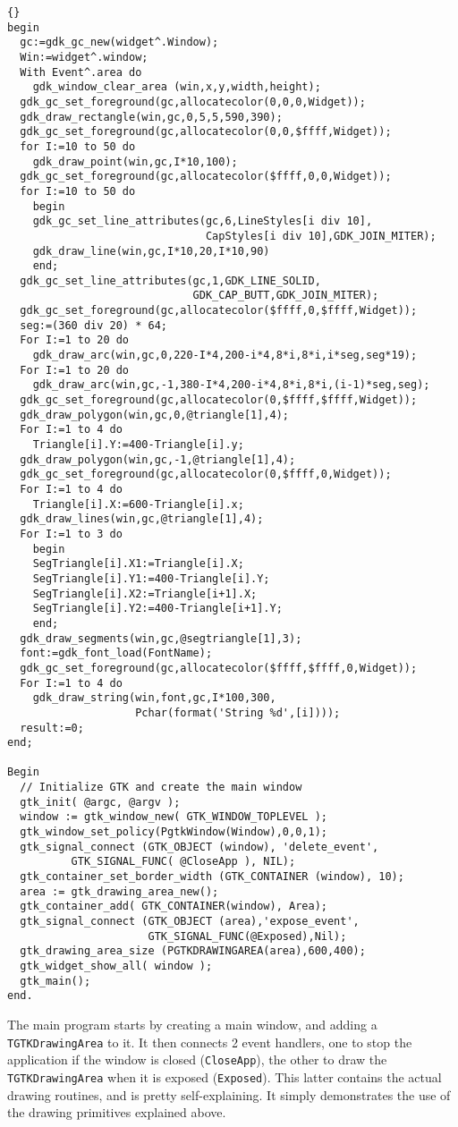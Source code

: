\documentclass[10pt]{article}
\newcommand{\var}[1]{\texttt{#1}}
\begin{document}
\begin{lstlisting}{}
begin
  gc:=gdk_gc_new(widget^.Window);
  Win:=widget^.window;
  With Event^.area do
    gdk_window_clear_area (win,x,y,width,height);
  gdk_gc_set_foreground(gc,allocatecolor(0,0,0,Widget));
  gdk_draw_rectangle(win,gc,0,5,5,590,390);
  gdk_gc_set_foreground(gc,allocatecolor(0,0,$ffff,Widget));
  for I:=10 to 50 do
    gdk_draw_point(win,gc,I*10,100);
  gdk_gc_set_foreground(gc,allocatecolor($ffff,0,0,Widget));
  for I:=10 to 50 do
    begin
    gdk_gc_set_line_attributes(gc,6,LineStyles[i div 10],
                               CapStyles[i div 10],GDK_JOIN_MITER);
    gdk_draw_line(win,gc,I*10,20,I*10,90)
    end;
  gdk_gc_set_line_attributes(gc,1,GDK_LINE_SOLID,
                             GDK_CAP_BUTT,GDK_JOIN_MITER);
  gdk_gc_set_foreground(gc,allocatecolor($ffff,0,$ffff,Widget));
  seg:=(360 div 20) * 64;
  For I:=1 to 20 do
    gdk_draw_arc(win,gc,0,220-I*4,200-i*4,8*i,8*i,i*seg,seg*19);
  For I:=1 to 20 do
    gdk_draw_arc(win,gc,-1,380-I*4,200-i*4,8*i,8*i,(i-1)*seg,seg);
  gdk_gc_set_foreground(gc,allocatecolor(0,$ffff,$ffff,Widget));
  gdk_draw_polygon(win,gc,0,@triangle[1],4);  
  For I:=1 to 4 do
    Triangle[i].Y:=400-Triangle[i].y;
  gdk_draw_polygon(win,gc,-1,@triangle[1],4);  
  gdk_gc_set_foreground(gc,allocatecolor(0,$ffff,0,Widget));
  For I:=1 to 4 do
    Triangle[i].X:=600-Triangle[i].x;
  gdk_draw_lines(win,gc,@triangle[1],4);
  For I:=1 to 3 do
    begin
    SegTriangle[i].X1:=Triangle[i].X;
    SegTriangle[i].Y1:=400-Triangle[i].Y;
    SegTriangle[i].X2:=Triangle[i+1].X;
    SegTriangle[i].Y2:=400-Triangle[i+1].Y;
    end;
  gdk_draw_segments(win,gc,@segtriangle[1],3);
  font:=gdk_font_load(FontName);
  gdk_gc_set_foreground(gc,allocatecolor($ffff,$ffff,0,Widget));
  For I:=1 to 4 do
    gdk_draw_string(win,font,gc,I*100,300,
                    Pchar(format('String %d',[i])));
  result:=0;
end;

Begin
  // Initialize GTK and create the main window
  gtk_init( @argc, @argv );
  window := gtk_window_new( GTK_WINDOW_TOPLEVEL );
  gtk_window_set_policy(PgtkWindow(Window),0,0,1);
  gtk_signal_connect (GTK_OBJECT (window), 'delete_event',
          GTK_SIGNAL_FUNC( @CloseApp ), NIL);
  gtk_container_set_border_width (GTK_CONTAINER (window), 10);
  area := gtk_drawing_area_new();
  gtk_container_add( GTK_CONTAINER(window), Area);
  gtk_signal_connect (GTK_OBJECT (area),'expose_event',
                      GTK_SIGNAL_FUNC(@Exposed),Nil);
  gtk_drawing_area_size (PGTKDRAWINGAREA(area),600,400);
  gtk_widget_show_all( window ); 
  gtk_main();
end.
\end{lstlisting}
The main program starts by creating a main window,
and adding a \var{TGTKDrawingArea} to it. It then connects 2 event handlers,
one to stop the application if the window is closed (\var{CloseApp}),
the other to draw the \var{TGTKDrawingArea} when it is exposed 
(\var{Exposed}). This latter contains the actual drawing routines, and is
pretty self-explaining. It simply demonstrates the use of the drawing
primitives explained above.
\end{document}
